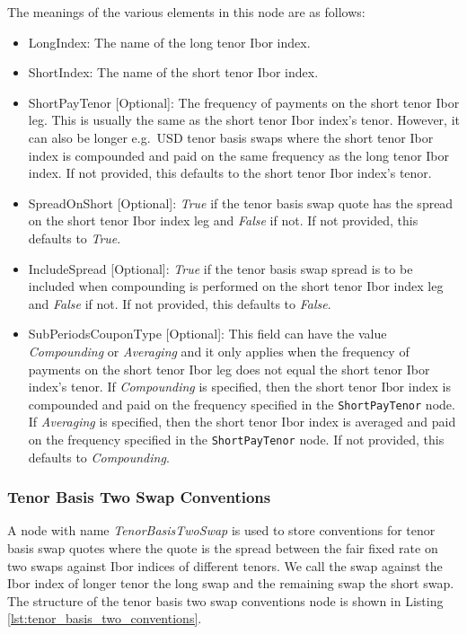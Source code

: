 The meanings of the various elements in this node are as follows:
\begin{itemize}
\item LongIndex: The name of the long tenor Ibor index.
\item ShortIndex: The name of the short tenor Ibor index.
\item ShortPayTenor [Optional]: The frequency of payments on the short tenor Ibor leg. This is usually the same as the
short tenor Ibor index's tenor. However, it can also be longer e.g.\ USD tenor basis swaps where the short tenor Ibor
index is compounded and paid on the same frequency as the long tenor Ibor index. If not provided, this defaults to the
short tenor Ibor index's tenor.
\item SpreadOnShort [Optional]: \emph{True} if the tenor basis swap quote has the spread on the short tenor Ibor index
leg and \emph{False} if not. If not provided, this defaults to \emph{True}.
\item IncludeSpread [Optional]: \emph{True} if the tenor basis swap spread is to be included when compounding is
performed on the short tenor Ibor index leg and \emph{False} if not. If not provided, this defaults to \emph{False}.
\item SubPeriodsCouponType [Optional]: This field can have the value \emph{Compounding} or \emph{Averaging} and it only
applies when the frequency of payments on the short tenor Ibor leg does not equal the short tenor Ibor index's tenor. If
\emph{Compounding} is specified, then the short tenor Ibor index is compounded and paid on the frequency specified in
the \lstinline!ShortPayTenor! node. If \emph{Averaging} is specified, then the short tenor Ibor index is averaged and
paid on the frequency specified in the \lstinline!ShortPayTenor! node. If not provided, this defaults to
\emph{Compounding}.
\end{itemize}

\subsubsection{Tenor Basis Two Swap Conventions}
A node with name \emph{TenorBasisTwoSwap} is used to store conventions for tenor basis swap quotes where the quote is
the spread between the fair fixed rate on two swaps against Ibor indices of different tenors. We call the swap against
the Ibor index of longer tenor the long swap and the remaining swap the short swap. The structure of the tenor basis two
swap conventions node is shown in Listing \ref{lst:tenor_basis_two_conventions}.

